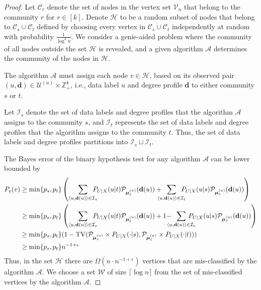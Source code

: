 \documentclass[11pt]{article}
\theoremstyle{plain}
\theoremstyle{definition}
\begin{document}
\begin{proof}
    Let $\mathcal{C}_r$ denote the set of nodes in the vertex set
$\mathcal V_n$ that belong to the community $r$ for $r \in [k]$.
Denote $\mathcal{H}$ to be a random subset of nodes that
belong to $\mathcal{C}_s \cup \mathcal{C}_t$ defined by choosing
every vertex  in $\mathcal{C}_s \cup \mathcal{C}_t$ independently at random with probability
$\frac{1}{\log^3 n}$. 
We consider a genie-aided problem where the community of all nodes outside the set $\mathcal{H}$ is revealed, and a given algorithm $\mathscr{A}$ determines the community of the nodes in $\mathcal{H}$.

The algorithm $\mathscr{A}$ must assign each node $v\in\mathcal{H}$, based on its observed pair $(u,\mathbf{d})\in\mathcal{U}^{(n)}\times\mathbb{Z}_+^k$, i.e., data label $u$ and degree profile $\mathbf{d}$ to either community $s$ or $t$.



Let $\mathcal{I}_s$ denote the set of data labels and degree profiles that the algorithm $\mathscr{A}$ assigns to the community $s$, and $\mathcal{I}_t$ represents the set of data labels and degree profiles that the algorithm assigns to the community $t$. Thus, the set of data labels and degree profiles partitions into $\mathcal{I}_s \sqcup \mathcal{I}_t$. 

The Bayes error of the binary hypothesis test for any algorithm $\mathscr{A}$ can be lower bounded by
\begin{align*}
    P_e(v) &\ge \min\{p_s,p_t\} \left(\sum_{\langle u, \mathbf{d}(u) \rangle \in \mathcal{I}_s} \hspace{-2ex} P_{U|X}(u|t) \mathcal{P}_{\boldsymbol{\mu}_t^{(n)}} (\mathbf{d}(u)) +  \hspace{-2ex}
                \sum_{\langle u, \mathbf{d}(u) \rangle \in \mathcal{I}_t} \hspace{-2ex} P_{U|X}(u|s) \mathcal{P}_{\boldsymbol{\mu}_s^{(n)}} (\mathbf{d}(u)) \right) \\
            &\ge \min\{p_s,p_t\} \left(\sum_{\langle u, \mathbf{d}(u) \rangle \in \mathcal{I}_s} \hspace{-2ex} P_{U|X}(u|t) \mathcal{P}_{\boldsymbol{\mu}_t^{(n)}} (\mathbf{d}(u)) + 1 {-}  \hspace{-2ex}
            \sum_{\langle u, \mathbf{d}(u) \rangle \in \mathcal{I}_s} \hspace{-3ex} P_{U|X}(u|s) \mathcal{P}_{\boldsymbol{\mu}_s^{(n)}} (\mathbf{d}(u)) \right) \\
            & \ge \min\{p_s, p_t\}(1 - \mathrm{TV}(\mathcal{P}_{\boldsymbol{\mu}_s^{(n)}} \times P_{U|X}(\cdot|s)  ,    \mathcal{P}_{\boldsymbol{\mu}_t^{(n)}} \times P_{U|X}(\cdot|t) )) \\
            & \ge \min\{p_s, p_t\} n^{-1+\epsilon}
\end{align*}
Thus, in the set $\mathcal{H}$ there are  $\Omega(n \cdot n^{-1 + \epsilon})$ vertices that are mis-classified by
the algorithm $\mathscr{A}$. We choose a set $\mathcal{W}$ of size
$\lceil \log n \rceil$ from the set of mis-classified vertices by the algorithm $\mathscr{A}$.


\end{proof}
\end{document}
